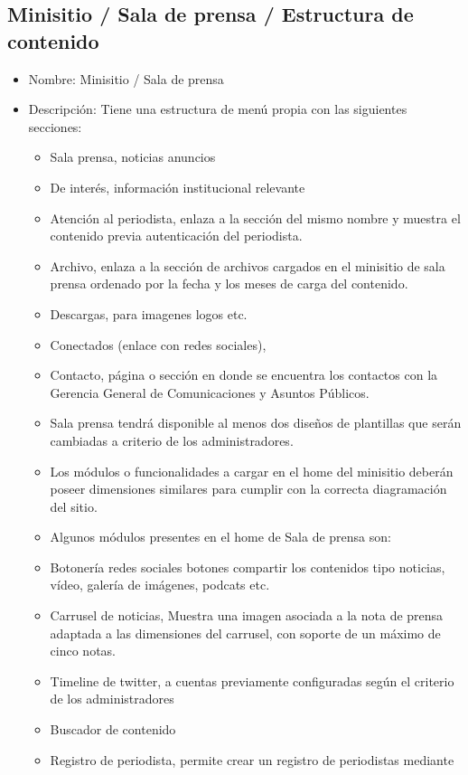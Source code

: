 \documentclass[11pt, letterpaper, oneside, spanish]{scrbook}
\begin{document}
\subsection{Minisitio / Sala de prensa / Estructura de contenido}
\label{sec-2-1-38}

\begin{itemize}
\item Nombre: Minisitio / Sala de prensa
\item Descripción: Tiene una estructura de menú propia con las siguientes
  secciones:
\begin{itemize}
\item Sala prensa, noticias anuncios
\item De interés, información institucional relevante
\item Atención al periodista, enlaza a la sección del mismo nombre y muestra el
    contenido previa autenticación del periodista.
\item Archivo, enlaza a la sección de archivos cargados en el minisitio de sala
    prensa ordenado por la fecha y los meses de carga del contenido.
\item Descargas, para imagenes logos etc.
\item Conectados (enlace con redes sociales),
\item Contacto, página o sección en donde se encuentra los contactos con la
    Gerencia General de Comunicaciones y Asuntos Públicos.
\item Sala prensa tendrá disponible al menos dos diseños de plantillas que serán
    cambiadas a criterio de los administradores.
\item Los módulos o funcionalidades a cargar en el home del minisitio deberán
    poseer dimensiones similares para cumplir con la correcta diagramación del
    sitio.
\item Algunos módulos presentes en el home de Sala de prensa son:
\item Botonería redes sociales botones compartir los contenidos tipo noticias,
    vídeo, galería de imágenes, podcats etc.
\item Carrusel de noticias, Muestra una imagen asociada a la nota de prensa
    adaptada a las dimensiones del carrusel, con soporte de un máximo de cinco
    notas.
\item Timeline de twitter, a cuentas previamente configuradas según el criterio
    de los administradores
\item Buscador de contenido
\item Registro de periodista, permite crear un registro de periodistas mediante

\end{itemize}
\end{itemize}
\end{document}
